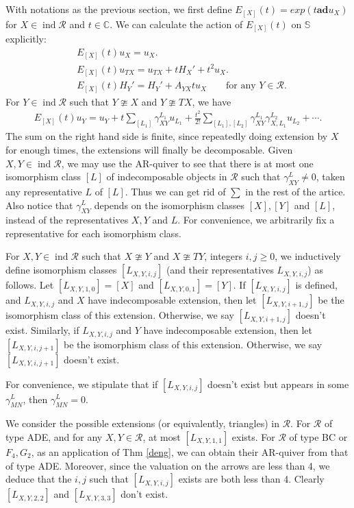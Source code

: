 \documentclass[12pt]{amsart}
\begin{document}
With notations as the previous section, 
we first define $E_{[X]}(t)=exp(t \mathbf{ad} u_X)$ for $X \in \operatorname{ind}\mathcal{R}$ and $t \in \mathbb{C}$. 
We can calculate the action of $E_{[X]}(t)$ on $\mathbb{S}$ explicitly:
\begin{align}
    &E_{[X]}(t)u_X=u_X .\\
    &E_{[X]}(t)u_{TX}=u_{TX}+tH_X'+t^2u_X .\\
    &E_{[X]}(t)H_Y'=H_Y'+A_{YX}tu_X   \qquad \text{for any }  Y \in \mathcal{R} .
\end{align}
For $Y\in \operatorname{ind}\mathcal{R}$ such that $Y \ncong X$ and $Y \ncong TX$, we have 
\begin{align*}
    E_{[X]}(t)u_Y=u_Y+t\sum\limits_{[L_1]} \gamma^{L_1}_{XY} u_{L_1} + \frac{t^2}{2!}\sum\limits_{[L_1],[L_2]} \gamma^{L_1}_{XY} \gamma^{L_2}_{X,L_1} u_{L_2} + \cdots.
\end{align*}
The sum on the right hand side is finite, since repeatedly doing extension by $X$ for enough times, the extensions will finally be decomposable.
Given $X,Y \in \operatorname{ind}\mathcal{R}$, we may use the AR-quiver to see that there is at most one isomorphism class $[L]$ of indecomposable objects in $\mathcal{R}$ such that $\gamma^L_{XY} \neq 0$, taken any representative $L$ of $[L]$.
Thus we can get rid of $\sum$ in the rest of the artice.
Also notice that $\gamma^L_{XY}$ depends on the isomorphism classes $[X],[Y]$ and $[L]$, instead of the representatives $X,Y$ and $L$.
For convenience, we arbitrarily fix a representative for each isomorphism class.

For $X,Y\in \operatorname{ind}\mathcal{R}$ such that $X\ncong Y$ and $X \ncong TY$, integers $i,j\geq 0$, we inductively define isomorphism classes $[L_{X,Y,i,j}]$ (and their representatives $L_{X,Y,i,j}$) as follows.
Let $[L_{X,Y,1,0}]=[X]$ and $[L_{X,Y,0,1}]=[Y]$. 
If $[L_{X,Y,i,j}]$ is defined, and $L_{X,Y,i,j}$ and $X$ have indecomposable extension, then let $[L_{X,Y,i+1,j}]$ be the isomorphism class of this extension. 
Otherwise, we say $[L_{X,Y,i+1,j}]$ doesn't exist.
Similarly, if  $L_{X,Y,i,j}$ and $Y$ have indecomposable extension, then let $[L_{X,Y,i,j+1}]$ be the isomorphism class of this extension.
Otherwise, we say $[L_{X,Y,i,j+1}]$ doesn't exist.

For convenience, we stipulate that
if $[L_{X,Y,i,j}]$ doesn't exist but appears in some $\gamma_{MN}^L$, then $\gamma_{MN}^L = 0$.

We consider the possible extensions (or equivalently, triangles) in $\mathcal{R}$.
For $\mathcal{R}$ of type ADE, and for any $X,Y\in \mathcal{R}$, at most $[L_{X,Y,1,1}]$ exists.
For $\mathcal{R}$ of type BC or $F_4,G_2$, as an application of Thm \ref{deng}, we can obtain their AR-quiver from that of type ADE.
Moreover, since the valuation on the arrows are less than 4, we deduce that the $i,j$ such that $[L_{X,Y,i,j}]$ exists are both less than 4. 
Clearly $[L_{X,Y,2,2}]$ and $[L_{X,Y,3,3}]$ don't exist.
\end{document}
